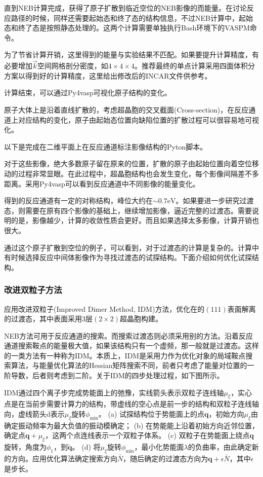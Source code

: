 直到\textrm{NEB}计算完成，获得了原子扩散到临近空位的\textrm{NEB}影像的而能量。在讨论反应路径的时候，同样还需要起始态和终了态的结构信息，不过\textrm{NEB}计算中，起始态和终了态是按照静态处理的。这两个计算需要单独执行\textrm{Bash}环境下的\textrm{VASP}M命令。

为了节省计算开销，这里得到的能量与实验结果不匹配。如果要提升计算精度，有必要增加$\vec k$空间网格剖分密度，如$4\times4\times4$。推荐最终的单点计算采用四面体积分方案以得到好的计算精度，这里给出修改后的\textrm{INCAR}文件供参考。

计算结束，可以通过\textrm{Py4vasp}可视化原子结构的变化。

原子大体上是沿着直线扩散的，考虑超晶胞的交叉截面\textrm{(Cross-section)}，在反应通道上对应结构的变化，原子由起始态位置向缺陷位置的扩散过程可以很容易地可视化。

以下是完成在二维平面上在反应通道标注影像结构的\textrm{Pyton}脚本。

对于这些影像，绝大多数原子留在原来的位置，扩散的原子由起始位置向着空位移动的过程非常显眼。在此过程中，超晶胞结构也会发生变化，每个影像间隔差不多距离。采用\textrm{Py4vasp}可以看到反应通道中不同影像的能量变化。

得到的反应通道有一定的对称结构，峰位大约在$\sim0.7\mathrm{eV}$。如果要进一步研究过渡态，则需要在原有四个影像的基础上，继续增加影像，逼近完整的过渡态。需要说明的是，影像越少，计算的收敛性质会更好。而且如果选择太多影像，计算开销也很大。

通过这个原子扩散到空位的例子，可以看到，对于过渡态的计算是复杂的。计算中有时候选择反应中间体影像作为寻找过渡态的试探结构。下面介绍如何优化试探结构。

\subsubsection{改进双粒子方法}
应用改进双粒子\textrm{(Improved Dimer Method, IDM)}方法，优化在的$(111)$表面解离的过渡态，其中表面采用3层$(2\times2)$超晶胞构建。

\textrm{NEB}方法可用于反应通道的搜索。而搜索过渡态则必须采用别的方法。沿着反应通道搜索鞍点的能量极大值，如果该结构只有一个虚频，那一般就是过渡态。这样的一类方法有一种称为\textrm{IDM}。本质上，\textrm{IDM}是采用力作为优化对象的局域鞍点搜索算法，与能量优化算法的\textrm{Hessian}矩阵搜索不同，前者只考虑了能量对位置的一阶导数，后者则考虑到二阶。关于\textrm{IDM}的四步处理过程，如下图所示。

\textrm{IDM}通过四个离子步完成势能面上的弛豫，实线箭头表示双粒子连线轴$\mu_{\xi}$，实心点是在当前步需要计算力的结构，带虚线的空心点是前一步的结构和双粒子连线轴向，虚线箭头\textrm{d}表示$\mu_{\xi}$旋转$\phi_{\mathrm{min}}$。
(a) 试探结构位于势能面上的点$\mathbf{q}$，初始方向$\mu_{\xi}$由确定振动频率为最大负值的振动模确定；
(b) 在势能能上沿着初始方向近邻位置，确定点$\mathbf{q}+\mu_{\xi}$，这两个点连线表示一个双粒子体系。
(c) 双粒子在势能面上绕点$\mathbf{q}$旋转，角度为$\phi_1$，到$\tilde{\mathbf{q}}$。
(d) 将$\mu_{\xi}$旋转$\phi_{\mathrm{min}}$，最小化势能面$\lambda$的负曲率，由此确定新的方向。应用优化算法确定搜索方向$\bar{N}$，随后确定的过渡态方向为$\mathbf{q}+\epsilon\bar{N}$，其中$\epsilon$是步长。


